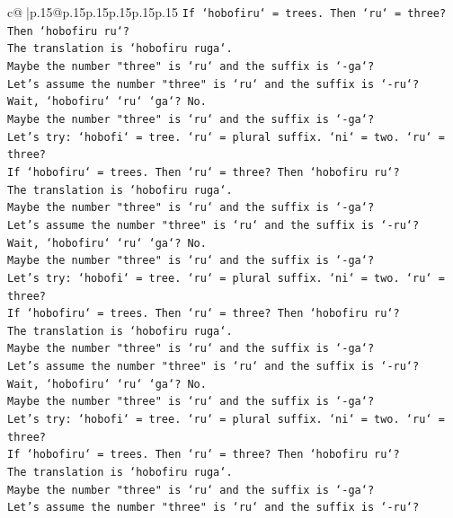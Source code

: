 \documentclass{article}
\begin{document}
{\begin{supertabular}{c@{$\;$}|p{.15\linewidth}@{}p{.15\linewidth}p{.15\linewidth}p{.15\linewidth}p{.15\linewidth}p{.15\linewidth}}
{{{\texttt{If `hobofiru` = trees. Then `ru` = three? Then `hobofiru ru`?} \\
\texttt{The translation is `hobofiru ruga`.} \\
\texttt{Maybe the number "three" is `ru` and the suffix is `{-}ga`?} \\
\texttt{Let's assume the number "three" is `ru` and the suffix is `{-}ru`?} \\
\texttt{Wait, `hobofiru` `ru` `ga`? No.} \\
\texttt{Maybe the number "three" is `ru` and the suffix is `{-}ga`?} \\
\texttt{Let's try: `hobofi` = tree. `ru` = plural suffix. `ni` = two. `ru` = three?} \\
\texttt{If `hobofiru` = trees. Then `ru` = three? Then `hobofiru ru`?} \\
\texttt{The translation is `hobofiru ruga`.} \\
\texttt{Maybe the number "three" is `ru` and the suffix is `{-}ga`?} \\
\texttt{Let's assume the number "three" is `ru` and the suffix is `{-}ru`?} \\
\texttt{Wait, `hobofiru` `ru` `ga`? No.} \\
\texttt{Maybe the number "three" is `ru` and the suffix is `{-}ga`?} \\
\texttt{Let's try: `hobofi` = tree. `ru` = plural suffix. `ni` = two. `ru` = three?} \\
\texttt{If `hobofiru` = trees. Then `ru` = three? Then `hobofiru ru`?} \\
\texttt{The translation is `hobofiru ruga`.} \\
\texttt{Maybe the number "three" is `ru` and the suffix is `{-}ga`?} \\
\texttt{Let's assume the number "three" is `ru` and the suffix is `{-}ru`?} \\
\texttt{Wait, `hobofiru` `ru` `ga`? No.} \\
\texttt{Maybe the number "three" is `ru` and the suffix is `{-}ga`?} \\
\texttt{Let's try: `hobofi` = tree. `ru` = plural suffix. `ni` = two. `ru` = three?} \\
\texttt{If `hobofiru` = trees. Then `ru` = three? Then `hobofiru ru`?} \\
\texttt{The translation is `hobofiru ruga`.} \\
\texttt{Maybe the number "three" is `ru` and the suffix is `{-}ga`?} \\
\texttt{Let's assume the number "three" is `ru` and the suffix is `{-}ru`?} \\
}}}
\end{supertabular}}
\end{document}
